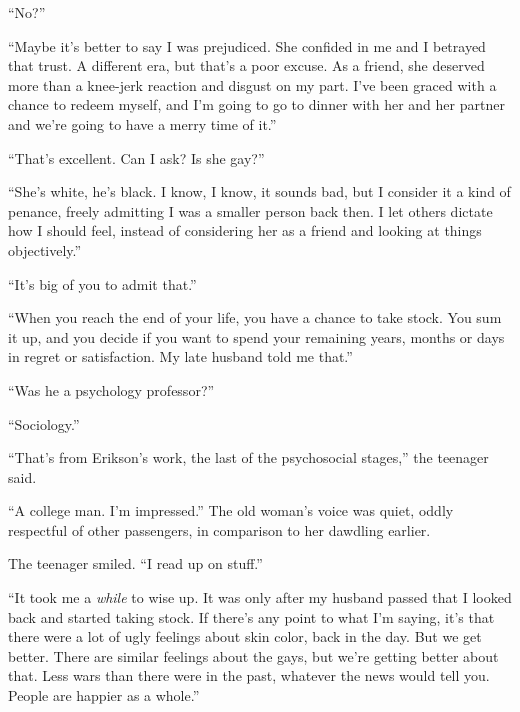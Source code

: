 ``No?''



``Maybe it's better to say I was prejudiced.  She confided in me and I betrayed that trust.  A different era, but that's a poor excuse.  As a friend, she deserved more than a knee-jerk reaction and disgust on my part.  I've been graced with a chance to redeem myself, and I'm going to go to dinner with her and her partner and we're going to have a merry time of it.''



``That's excellent.  Can I ask?  Is she gay?''



``She's white, he's black.  I know, I know, it sounds bad, but I consider it a kind of penance, freely admitting I was a smaller person back then.  I let others dictate how I should feel, instead of considering her as a friend and looking at things objectively.''



``It's big of you to admit that.''



``When you reach the end of your life, you have a chance to take stock.  You sum it up, and you decide if you want to spend your remaining years, months or days in regret or satisfaction.  My late husband told me that.''



``Was he a psychology professor?''



``Sociology.''



``That's from Erikson's work, the last of the psychosocial stages,'' the teenager said.



``A college man.  I'm impressed.''  The old woman's voice was quiet, oddly respectful of other passengers, in comparison to her dawdling earlier.



The teenager smiled.  ``I read up on stuff.''



``It took me a \emph{while} to wise up.  It was only after my husband passed that I looked back and started taking stock.  If there's any point to what I'm saying, it's that there were a lot of ugly feelings about skin color, back in the day.  But we get better.  There are similar feelings about the gays, but we're getting better about that.  Less wars than there were in the past, whatever the news would tell you.  People are happier as a whole.''



